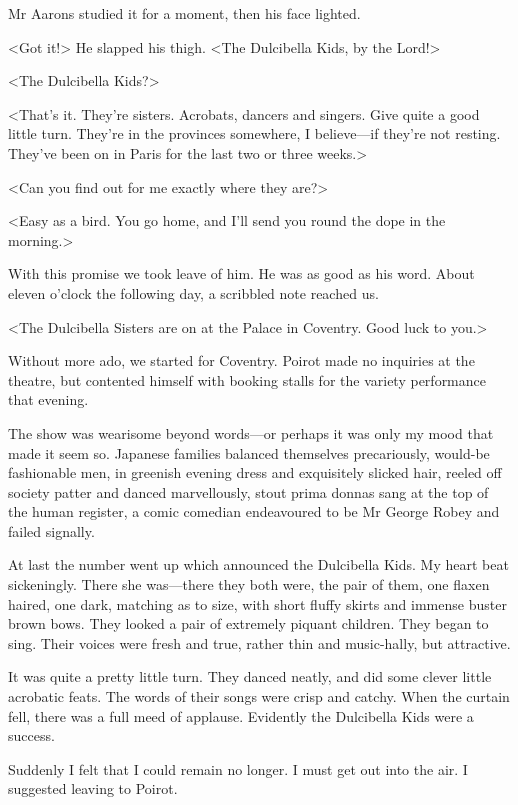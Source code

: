  Mr Aarons studied it for a moment, then his face lighted. 

 <Got it!> He slapped his thigh. <The Dulcibella Kids, by the Lord!> 

 <The Dulcibella Kids?> 

 <That's it. They're sisters. Acrobats, dancers and singers. Give quite a good little turn. They're in the provinces somewhere, I believe—if they're not resting. They've been on in Paris for the last two or three weeks.> 

 <Can you find out for me exactly where they are?> 

 <Easy as a bird. You go home, and I'll send you round the dope in the morning.> 

 With this promise we took leave of him. He was as good as his word. About eleven o'clock the following day, a scribbled note reached us. 

 <The Dulcibella Sisters are on at the Palace in Coventry. Good luck to you.> 

 Without more ado, we started for Coventry. Poirot made no inquiries at the theatre, but contented himself with booking stalls for the variety performance that evening. 

 The show was wearisome beyond words—or perhaps it was only my mood that made it seem so. Japanese families balanced themselves precariously, would-be fashionable men, in greenish evening dress and exquisitely slicked hair, reeled off society patter and danced marvellously, stout prima donnas sang at the top of the human register, a comic comedian endeavoured to be Mr George Robey and failed signally. 

 At last the number went up which announced the Dulcibella Kids. My heart beat sickeningly. There she was—there they both were, the pair of them, one flaxen haired, one dark, matching as to size, with short fluffy skirts and immense buster brown bows. They looked a pair of extremely piquant children. They began to sing. Their voices were fresh and true, rather thin and music-hally, but attractive. 

 It was quite a pretty little turn. They danced neatly, and did some clever little acrobatic feats. The words of their songs were crisp and catchy. When the curtain fell, there was a full meed of applause. Evidently the Dulcibella Kids were a success. 

 Suddenly I felt that I could remain no longer. I must get out into the air. I suggested leaving to Poirot. 

